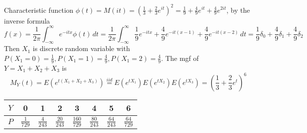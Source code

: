 Characteristic function $\phi(t)=M(it)=\left( \frac{1}{3}+\frac{2}{3}e^{ it } \right)^{2}=\frac{1}{9}+\frac{4}{9}e^{ it }+\frac{4}{9}e^{ 2it }$, by the inverse formula
\[
f(x)=\frac{1}{2\pi}\int_{-\infty}^{\infty} e^{ -itx }\phi (t)  \, dt=\frac{1}{2\pi}\int_{-\infty}^{\infty} \frac{1}{9}e^{ -itx }+\frac{4}{9}e^{ -it(x-1) }+\frac{4}{9}e^{ -it(x-2) } \, dt = \frac{1}{9}\delta_0+\frac{4}{9}\delta_1+\frac{4}{9}\delta_2
\]
Then $X_1$ is discrete random variable with $P(X_1=0)=\frac{1}{9},P(X_1=1)=\frac{4}{9},P(X_1=2)=\frac{4}{9}$.
The mgf of $Y=X_1+X_2+X_3$ is
\[
M_{Y}(t)=E(e^{ t(X_1+X_2+X_3) })\overset{ iid }{ = }E(e^{ tX_1 })E(e^{ tX_2 })E(e^{ tX_3 })=\left( \frac{1}{3}+\frac{2}{3}e^{ t } \right)^{6}
\]
\begin{table}[h]
	\centering
	\begin{tabular}{|c|c|c|c|c|c|c|c|}
		\hline
		$Y$ & 0 & 1 & 2 & 3 & 4 & 5 & 6 \\
		\hline
		$P$ & $\frac{1}{729}$ & $\frac{4}{243}$ & $\frac{20}{243}$ & $\frac{160}{729}$ & $\frac{80}{243}$ & $\frac{64}{243}$ & $\frac{64}{729}$ \\
		\hline
	\end{tabular}
\end{table}